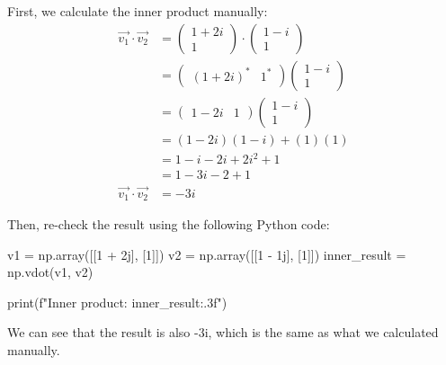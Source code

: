\documentclass[a4paper, 10pt]{article}
\begin{document}
\begin{solution}
	First, we calculate the inner product manually:
	\begin{align*}
		\vec{v_1} \cdot \vec{v_2} & = \begin{pmatrix} 1 + 2i \\ 1 \end{pmatrix} \cdot \begin{pmatrix} 1 - i \\ 1 \end{pmatrix} \\
		                          & = \begin{pmatrix} (1 + 2i)^* & 1^* \end{pmatrix} \begin{pmatrix} 1 - i \\ 1 \end{pmatrix}  \\
		                          & = \begin{pmatrix} 1 - 2i & 1 \end{pmatrix} \begin{pmatrix} 1 - i \\ 1 \end{pmatrix}        \\
		                          & = (1 - 2i)(1 - i) + (1)(1)                                                                 \\
		                          & = 1 - i - 2i + 2i^2 + 1                                                                    \\
		                          & = 1 - 3i - 2 + 1                                                                           \\
		\vec{v_1} \cdot \vec{v_2} & = -3i
	\end{align*}

	Then, re-check the result using the following Python code:

	\begin{codingbox}
v1 = np.array([[1 + 2j], [1]])
v2 = np.array([[1 - 1j], [1]])
inner_result = np.vdot(v1, v2)

print(f"Inner product: {inner_result:.3f}")
\end{codingbox}

	We can see that the result is also -3i, which is the same as what we calculated manually.
\end{solution}



\end{document}
